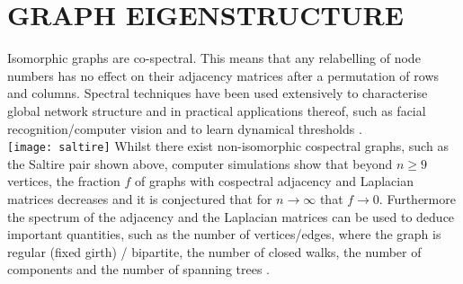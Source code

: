 \documentclass{article}
\begin{document}
\section{GRAPH EIGENSTRUCTURE}
Isomorphic graphs are co-spectral. This means that any relabelling of node numbers has no effect on their adjacency matrices after a permutation of rows and columns. Spectral techniques have been used extensively to characterise global network structure \citep{newman2006modularity} and in practical applications thereof, such as facial recognition/computer vision \citep{belkin2003laplacian} and to learn dynamical thresholds \citep{mcgraw2008laplacian}.
\\
 \texttt{[image: saltire]}
Whilst there exist non-isomorphic cospectral graphs, such as the Saltire pair shown above, computer simulations show that beyond $n\geq9$ vertices, the fraction $f$ of graphs with cospectral adjacency and Laplacian matrices decreases and it is conjectured that for $n\rightarrow\infty$ that $f\rightarrow 0$. Furthermore the spectrum of the adjacency and the Laplacian matrices can be used to deduce important quantities, such as the number of vertices/edges, where the graph is regular (fixed girth) / bipartite, the number of closed walks, the number of components and the number of spanning trees \citep{van2003graphs}.


\end{document}
